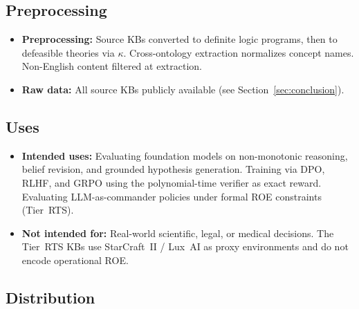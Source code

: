 \documentclass{article}
\theoremstyle{definition}
\begin{document}
\subsection*{Preprocessing}

\begin{itemize}[nosep]
\item \textbf{Preprocessing:} Source KBs converted to definite logic programs, then to defeasible theories via $\kappa$. Cross-ontology extraction normalizes concept names. Non-English content filtered at extraction.
\item \textbf{Raw data:} All source KBs publicly available (see Section~\ref{sec:conclusion}).
\end{itemize}

\subsection*{Uses}

\begin{itemize}[nosep]
\item \textbf{Intended uses:} Evaluating foundation models on non-monotonic reasoning, belief revision, and grounded hypothesis generation. Training via DPO, RLHF, and GRPO using the polynomial-time verifier as exact reward. Evaluating LLM-as-commander policies under formal ROE constraints (Tier~RTS).
\item \textbf{Not intended for:} Real-world scientific, legal, or medical decisions. The Tier~RTS KBs use StarCraft~II / Lux~AI as proxy environments and do not encode operational ROE.
\end{itemize}

\subsection*{Distribution}
\end{document}
